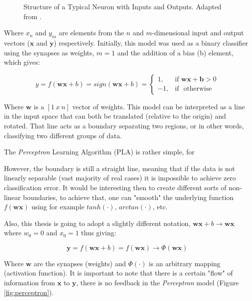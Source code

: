 \begin{figure}[H]
	\centering
	\def\svgwidth{0.6\columnwidth}
	
	\caption{Structure of a Typical Neuron with Inputs and Outputs. Adapted from \cite{wikimediacommonsNeuron2006}.}
	\label{fig:neurons_mod}
\end{figure}

Where $x_{n}$ and $y_{m}$ are elements from the $n$ and $m$-dimensional input and output vectors ($\textbf{x}$ and $\textbf{y}$) respectively. Initially, this model was used as a binary classifier using the synapses as weights, $m = 1$ and the addition of a bias (b) element, which gives:

\begin{equation}
	y = f(\textbf{w}\textbf{x} + b) = sign(\textbf{w}\textbf{x} + b) =
	\begin{cases} 
		1, & \mbox{if } \textbf{w}\textbf{x} + \textbf{b} > 0 \\
		-1, & \mbox{if } \mbox{ otherwise} 
	\end{cases}
\end{equation}

Where $\textbf{w}$ is a $[1\ x\ n]$ vector of weights. This model can be interpreted as a line in the input space that can both be translated (relative to the origin) and rotated. That line acts as a boundary separating two regions, or in other words, classifying two different groups of data.

The \textit{Perceptron} Learning Algorithm (PLA) is rather simple, for 

However, the boundary is still a straight line, meaning that if the data is not linearly separable (vast majority of real cases) it is impossible to achieve zero classification error. It would be interesting then to create different sorts of non-linear boundaries, to achieve that, one can "smooth" the underlying function $f(\textbf{w}\textbf{x})$ using for example $tanh(\cdot)$, $arctan(\cdot)$, etc.

Also, this thesis is going to adopt a slightly different notation, $\textbf{w}\textbf{x} + b \rightarrow \textbf{w}\textbf{x}$ where $w_{0} = 0$ and $x_{0} = 1$ thus giving:

\begin{equation}
\textbf{y} = f(\textbf{w}\textbf{x} + b) = f(\textbf{w}\textbf{x}) \rightarrow \Phi(\textbf{w}\textbf{x})
\end{equation}

Where $\textbf{w}$ are the synapses (weights) and $\Phi(\cdot)$ is an arbitrary mapping (activation function). It is important to note that there is a certain "flow" of information from $\textbf{x}$ to $\textbf{y}$, there is no feedback in the \textit{Perceptron} model (Figure \ref{fig:perceptron}).

